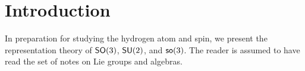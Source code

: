 \section{Introduction}
In preparation for studying the hydrogen atom and spin, we present the representation theory of $\operatorname{\textsf{SO}}(3)$, $\operatorname{\textsf{SU}}(2)$, and $\operatorname{\textsf{so}}(3)$. The reader is assumed to have read the set of notes on Lie groups and algebras.
